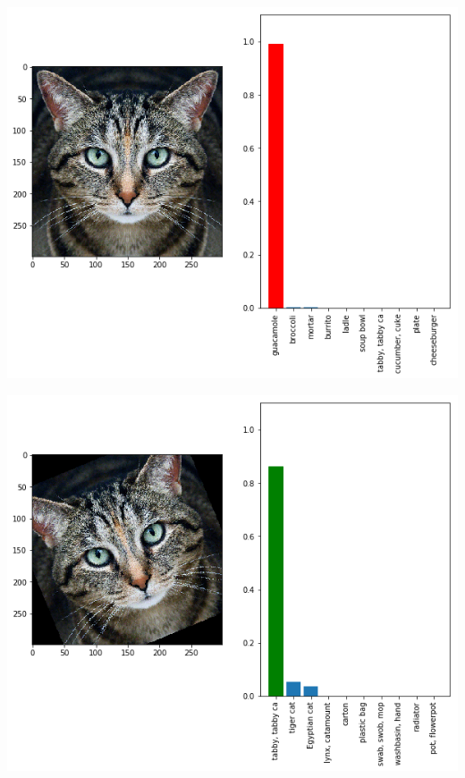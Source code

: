 \documentclass[aspectratio=43]{beamer}
\begin{document}
\begin{frame}
\includegraphics[scale=0.5]{images/cat_adversarial.png} 
\end{frame}

\begin{frame}
\includegraphics[scale=0.5]{images/cat_rotated.png} 
\end{frame}
\end{document}
